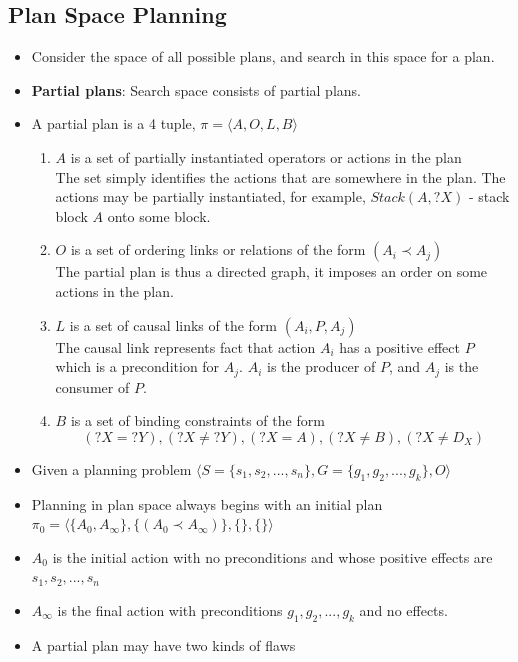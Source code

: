 \documentclass[a4paper]{article}
\begin{document}
\subsection{Plan Space Planning}
\begin{itemize}
    \item Consider the space of all possible plans, and search in this space for a plan.
    \item \textbf{Partial plans}: Search space consists of partial plans.
    \item A partial plan is a 4 tuple, $\pi=\langle A,O,L,B\rangle$
    \begin{enumerate}
        \item $A$ is a set of partially instantiated operators or actions in the plan\\
        The set simply identifies the actions that are somewhere in the plan. The actions may be partially instantiated, for example, $Stack(A,?X)$ - stack block $A$ onto some block.
        \item $O$ is a set of ordering links or relations of the form $(A_i\prec A_j)$\\
        The partial plan is thus a directed graph, it imposes an order on some actions in the plan.
        \item $L$ is a set of causal links of the form $(A_i,P,A_j)$\\
        The causal link represents fact that action $A_i$ has a positive effect $P$ which is a precondition for $A_j$. $A_i$ is the producer of $P$, and $A_j$ is the consumer of $P$.
        \item $B$ is a set of binding constraints of the form
        \begin{equation*}
            (?X=?Y),(?X\neq?Y),(?X=A),(?X\neq B),(?X\neq D_X)
        \end{equation*}
    \end{enumerate}
    \item Given a planning problem $\langle S=\{s_1,s_2,...,s_n\},G=\{g_1,g_2,...,g_k\},O\rangle$
    \item Planning in plan space always begins with an initial plan $\pi_0=\langle \{A_0,A_\infty\},\{(A_0\prec A_\infty)\},\{\},\{\}\rangle$
    \item $A_0$ is the initial action with no preconditions and whose positive effects are $s_1,s_2,...,s_n$
    \item $A_\infty$ is the final action with preconditions $g_1,g_2,...,g_k$ and no effects.
    \item A partial plan may have two kinds of flaws

\end{itemize}
\end{document}
